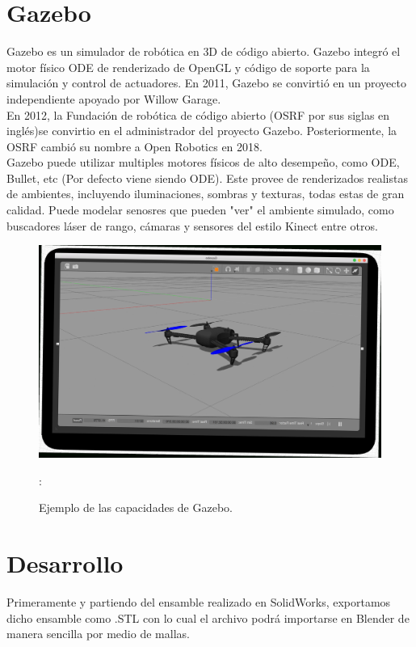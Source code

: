 \documentclass[11pt,a4paper,oldfontcommands,oneside]{memoir}
\begin{document}
\chapter{Gazebo}

Gazebo es un simulador de robótica en 3D de código abierto. Gazebo integró el motor físico ODE de renderizado de OpenGL y código de soporte para la simulación y control de actuadores. En 2011, Gazebo se convirtió en un proyecto independiente apoyado por Willow Garage.\\
En 2012, la Fundación de robótica de código abierto (OSRF por sus siglas en inglés)se convirtio en el administrador del proyecto Gazebo. Posteriormente, la OSRF cambió su nombre a Open Robotics en 2018. \\ 
Gazebo puede utilizar multiples motores físicos de alto desempeño, como ODE, Bullet, etc (Por defecto viene siendo ODE). Este provee de renderizados realistas de ambientes, incluyendo iluminaciones, sombras y texturas, todas estas de gran calidad. Puede modelar senosres que pueden "ver" el ambiente simulado, como buscadores láser de rango, cámaras y sensores del estilo Kinect entre otros.

\begin{figure}
\begin{center}
\includegraphics[scale=.12]{gazebo.jpg}
\end{center}
\caption{Ejemplo de las capacidades de Gazebo.}
\label{blender}:
\end{figure}


\chapter{Desarrollo}
Primeramente y partiendo del ensamble realizado en SolidWorks, exportamos dicho ensamble como .STL con lo cual el archivo podrá importarse en Blender de manera sencilla por medio de mallas.
\end{document}
